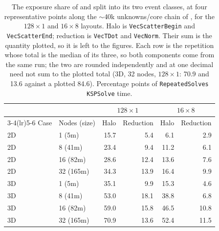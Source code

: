 \documentclass[11pt,a4paper,oneside]{report}
\begin{document}
\begin{table}[htbp]
  \centering
  \caption{The exposure share of  and  split into its
  two event classes, at four representative points along the $\sim$40k unknowns/core chain
  of , for the $128\times1$ and $16\times8$ layouts. Halo is
  \texttt{VecScatterBegin} and \texttt{VecScatterEnd}; reduction is \texttt{VecTDot} and
  \texttt{VecNorm}. Their sum is the quantity plotted, so it is left to the figures. Each row
  is the repetition whose total is the median of its three, so both components come from the
  same run; the two are rounded independently and at one decimal need not sum to the plotted
  total (3D, 32 nodes, $128\times1$: 70.9 and 13.6 against a plotted 84.6). Percentage points
  of \texttt{RepeatedSolves} \texttt{KSPSolve} time.}
  \label{tab:sync-split}
  \begin{tabular}{llrrrr}
    \toprule
    & & \multicolumn{2}{c}{$128\times1$} & \multicolumn{2}{c}{$16\times8$} \\
    \cmidrule(lr){3-4}\cmidrule(lr){5-6}
    Case & Nodes (size) & Halo & Reduction & Halo & Reduction \\
    \midrule
    2D &  1 (5m)    & 15.7 &  5.4 &  6.1 &  2.9 \\
    2D &  8 (41m)   & 23.4 &  9.4 & 11.2 &  6.1 \\
    2D & 16 (82m)   & 28.6 & 12.4 & 13.6 &  7.6 \\
    2D & 32 (165m)  & 34.3 & 13.9 & 16.4 &  9.9 \\
    \addlinespace
    3D &  1 (5m)    & 35.1 &  9.9 & 15.3 &  4.6 \\
    3D &  8 (41m)   & 53.0 & 18.1 & 38.8 &  6.8 \\
    3D & 16 (82m)   & 59.0 & 15.8 & 46.5 & 10.8 \\
    3D & 32 (165m)  & 70.9 & 13.6 & 52.4 & 11.5 \\
    \bottomrule
  \end{tabular}
\end{table}
\end{document}
